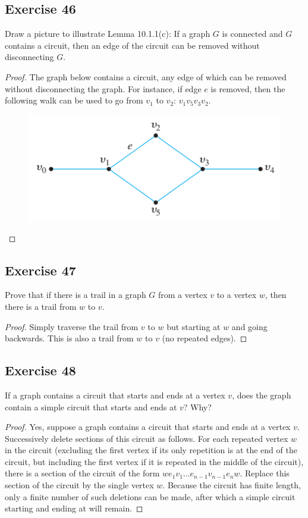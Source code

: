 \documentclass[14pt]{extarticle}
\begin{document}
\subsection{Exercise 46}
Draw a picture to illustrate Lemma 10.1.1(c): If a graph \(G\) is connected and \(G\) contains a circuit, then an edge of the
circuit can be removed without disconnecting \(G\).

\begin{proof}
    The graph below contains a circuit, any edge of which can be removed without disconnecting the graph. For instance, if edge
    \(e\) is removed, then the following walk can be used to go from \(v_1\) to \(v_2\): \(v_1v_5v_3v_2\).

    \begin{figure}[ht!]
        \centering
        \includegraphics[scale=0.5]{../images/10.1.46.png}
    \end{figure}
\end{proof}

\subsection{Exercise 47}
Prove that if there is a trail in a graph \(G\) from a vertex \(v\) to a vertex \(w\), then there is a trail from \(w\) to \(v\).

\begin{proof}
    Simply traverse the trail from \(v\) to \(w\) but starting at \(w\) and going backwards. This is also a trail from
    \(w\) to \(v\) (no repeated edges).
\end{proof}

\subsection{Exercise 48}
If a graph contains a circuit that starts and ends at a vertex \(v\), does the graph contain a simple circuit that starts and
ends at \(v\)? Why?

\begin{proof}
    Yes, suppose a graph contains a circuit that starts and ends at a vertex \(v\). Successively delete sections of this
    circuit as follows. For each repeated vertex \(w\) in the circuit (excluding the first vertex if its only repetition is
    at the end of the circuit, but including the first vertex if it is repeated in the middle of the circuit), there is a
    section of the circuit of the form \(we_1v_1 \ldots e_{n-1}v_{n-1}e_n w\). Replace this section of the circuit by the
    single vertex \(w\). Because the circuit has finite length, only a finite number of such deletions can be made, after
    which a simple circuit starting and ending at will remain.
\end{proof}
\end{document}
